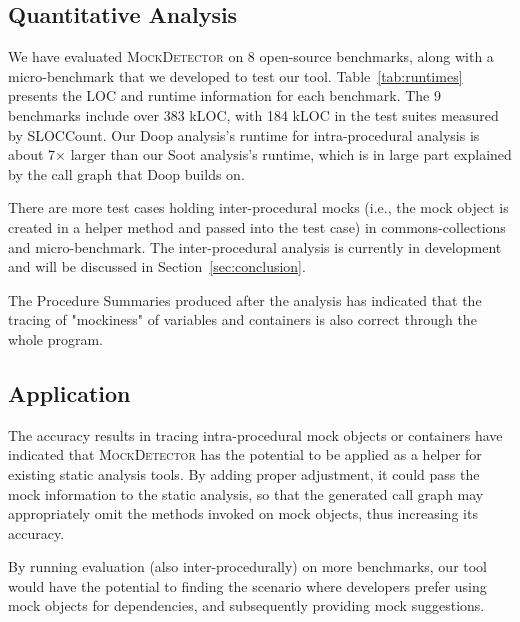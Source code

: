 \subsection{Quantitative Analysis}
\label{subsec:effectiveness}

We have evaluated \textsc{MockDetector} on 8 open-source benchmarks, along with a micro-benchmark that we developed to test our tool. Table~\ref{tab:runtimes} presents the LOC and runtime information for each benchmark. The 9 benchmarks include over 383 kLOC, with 184 kLOC in the test suites measured by SLOCCount. Our Doop analysis's runtime for intra-procedural analysis is about 7$\times$ larger than our Soot analysis's runtime, which is in large part explained by the call graph that Doop builds on. %

There are more test cases holding inter-procedural mocks (i.e., the mock object is created in a helper method and passed into the test case) in commons-collections and micro-benchmark. The inter-procedural analysis is currently in development and will be discussed in Section~\ref{sec:conclusion}.

The Procedure Summaries produced after the analysis has indicated that the tracing of "mockiness" of variables and containers is also correct through the whole program. 

\subsection{Application}
\label{subsec:static}

The accuracy results in tracing intra-procedural mock objects or containers have indicated that \textsc{MockDetector} has the potential to be applied as a helper for existing static analysis tools. By adding proper adjustment, it could pass the mock information to the static analysis, so that the generated call graph may appropriately omit the methods invoked on mock objects, thus increasing its accuracy.

By running evaluation (also inter-procedurally) on more benchmarks, our tool would have the potential to finding the scenario where developers prefer using mock objects for dependencies, and subsequently providing mock suggestions.
